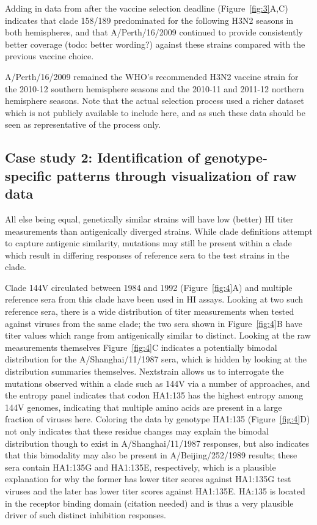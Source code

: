 \documentclass[utf8]{FrontiersinHarvard} %
\begin{document}
Adding in data from after the vaccine selection deadline (Figure~\ref{fig:3}A,C) indicates that clade 158/189 predominated for the following H3N2 seasons in both hemispheres, and that A/Perth/16/2009 continued to provide consistently better coverage (todo: better wording?) against these strains compared with the previous vaccine choice. 


A/Perth/16/2009 remained the WHO's recommended H3N2 vaccine strain for the 2010-12 southern hemisphere seasons and the 2010-11 and 2011-12 northern hemisphere seasons. Note that the actual selection process used a richer dataset which is not publicly available to include here, and as such these data should be seen as representative of the process only.


\subsection{Case study 2: Identification of genotype-specific patterns through visualization of raw data}

All else being equal, genetically similar strains will have low (better) HI titer measurements than antigenically diverged strains.
While clade definitions attempt to capture antigenic similarity, mutations may still be present within a clade which result in differing responses of reference sera to the test strains in the clade.


Clade 144V circulated between 1984 and 1992 (Figure~\ref{fig:4}A) and multiple reference sera from this clade have been used in HI assays.
Looking at two such reference sera, there is a wide distribution of titer measurements when tested against viruses from the same clade; the two sera shown in Figure~\ref{fig:4}B have titer values which range from antigenically similar to distinct.
Looking at the raw measurements themselves Figure~\ref{fig:4}C indicates a potentially bimodal distribution for the A/Shanghai/11/1987 sera, which is hidden by looking at the distribution summaries themselves.
Nextstrain allows us to interrogate the mutations observed within a clade such as 144V via a number of approaches, and the entropy panel indicates that codon HA1:135 has the highest entropy among 144V genomes, indicating that multiple amino acids are present in a large fraction of viruses here. 
Coloring the data by genotype HA1:135 (Figure~\ref{fig:4}D) not only indicates that these residue changes may explain the bimodal distribution though to exist in A/Shanghai/11/1987 responses, but also indicates that this bimodality may also be present in A/Beijing/252/1989 results; these sera contain HA1:135G and HA1:135E, respectively, which is a plausible explanation for why the former has lower titer scores against HA1:135G test viruses and the later has lower titer scores against HA1:135E.
HA:135 is located in the receptor binding domain (citation needed) and is thus a very plausible driver of such distinct inhibition responses.
\end{document}
